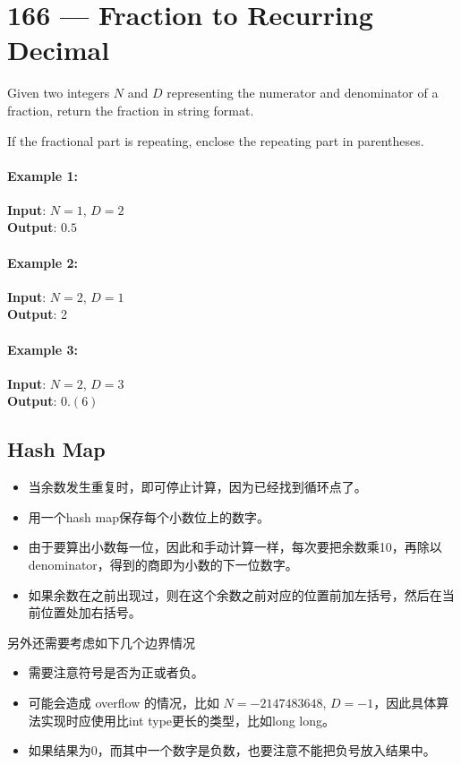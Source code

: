 \section{166 --- Fraction to Recurring Decimal}
Given two integers $N$ and $D$ representing the numerator and denominator of a fraction, return the fraction in string format.
\par
If the fractional part is repeating, enclose the repeating part in parentheses.
\paragraph{Example 1:}
\begin{flushleft}
\textbf{Input}: $N = 1$, $D = 2$
\\
\textbf{Output}: $0.5$
\end{flushleft}
\paragraph{Example 2:}
\begin{flushleft}
\textbf{Input}: $N = 2$, $D = 1$
\\
\textbf{Output}: 2
\end{flushleft}
\paragraph{Example 3:}
\begin{flushleft}
\textbf{Input}: $N = 2$, $D = 3$
\\
\textbf{Output}: $0.(6)$
\end{flushleft}
\subsection{Hash Map}
\begin{itemize}
    \item 当余数发生重复时，即可停止计算，因为已经找到循环点了。
    \item 用一个hash map保存每个小数位上的数字。
    \item 由于要算出小数每一位，因此和手动计算一样，每次要把余数乘10，再除以denominator，得到的商即为小数的下一位数字。
    \item 如果余数在之前出现过，则在这个余数之前对应的位置前加左括号，然后在当前位置处加右括号。
\end{itemize}
另外还需要考虑如下几个边界情况
\begin{itemize}
    \item 需要注意符号是否为正或者负。
    \item 可能会造成 overflow 的情况，比如 $N = -2147483648$, $D = -1$，因此具体算法实现时应使用比int type更长的类型，比如long long。
    \item 如果结果为0，而其中一个数字是负数，也要注意不能把负号放入结果中。
\end{itemize}

